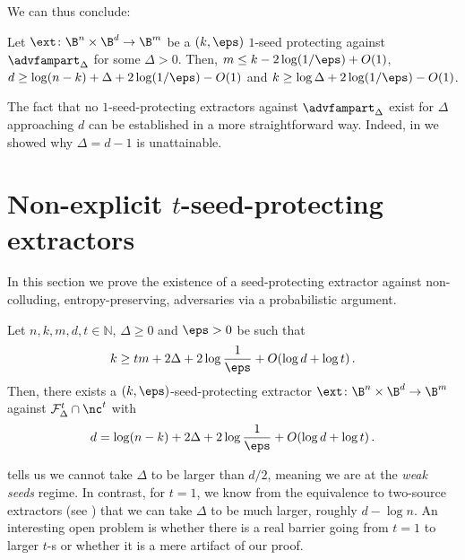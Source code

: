 \documentclass{toc}
\begin{document}
We can thus conclude:
\begin{corollary}
Let $\ext \colon \B^{n} \times \B^{d} \rightarrow \B^{m}$ be a $(k,\eps)$ $1$-seed protecting against $\advfampart_{\Delta}$ for some $\Delta > 0$.
Then, 
$m \le k - 2\log(1/\eps)+O(1)$, $d \ge  \log(n-k)+\Delta+2\log(1/\eps)-O(1)$
and $k \ge \log\Delta+2\log(1/\eps)-O(1)$.
\end{corollary}

The fact that no $1$-seed-protecting extractors against $\advfampart_\Delta$
exist for $\Delta$ approaching $d$ can be established in a more straightforward
way. 
Indeed, in  we showed why
$\Delta = d-1$ is unattainable.


%
\section{Non-explicit 
\texorpdfstring{$t$-seed-protecting}{t-seed-protecting} extractors}\label{sec:nexp}

In this section we prove the existence of a seed-protecting extractor against non-colluding, entropy-preserving, adversaries via a probabilistic argument.

\begin{theorem}\label{thm:non-explicit}
Let $n,k,m,d,t \in \mathbb{N}$, $\Delta \ge 0$ and $\eps > 0$ be such that
\[
k \ge tm+2\Delta+2\log\frac{1}{\eps}+O(\log d + \log t)\,.
\]
Then, there exists a $(k,\eps)$-seed-protecting extractor $\ext \colon \B^{n} \times \B^{d} \rightarrow \B^{m}$ against
$\mathcal{F}_{\Delta}^{t} \cap \nc^t$ with
\[
d  = \log(n-k) + 2\Delta +2\log\frac{1}{\eps}+O(\log d + \log t)\,.
\]
\end{theorem}

%
\begin{remark}  %
 tells us we cannot take $\Delta$ to be larger than %
%
$d/2$, 
%
meaning
we are at the \emph{weak seeds} regime. In contrast, for $t = 1$, we know from the
equivalence to two-source extractors (see ) that we can take
$\Delta$ to be much larger, roughly $d-\log n$. An interesting open problem is 
whether there is a real barrier going from $t = 1$ to larger $t$-s or whether it is a mere
artifact of our proof.
\end{remark}   %
\end{document}

